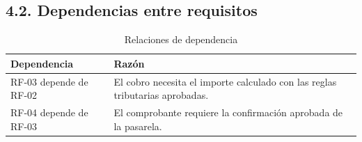 \documentclass[conference,onecolumn]{IEEEtran}
\begin{document}
\subsection*{4.2. Dependencias entre requisitos}
\begin{table}[H]
\centering
\caption{Relaciones de dependencia}
\scriptsize
\setlength{\tabcolsep}{3pt}
\begin{tabularx}{\columnwidth}{@{}L{0.35\columnwidth}Y@{}}
\toprule
\textbf{Dependencia} & \textbf{Razón}\\
\midrule
RF-03 depende de RF-02 & El cobro necesita el importe calculado con las reglas tributarias aprobadas.\\
RF-04 depende de RF-03 & El comprobante requiere la confirmación aprobada de la pasarela.\\
\bottomrule
\end{tabularx}
\end{table}
\end{document}
